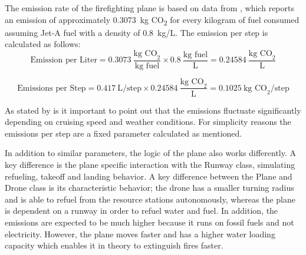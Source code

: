 \documentclass[11pt, a4paper]{article}
\begin{document}
The emission rate of the firefighting plane is based on data from \citet*{spicerRapidMeasurementEmissions2009}, which reports an emission of approximately \SI{0.3073}{\kilo\gram} CO\textsubscript{2} for every kilogram of fuel consumed assuming Jet-A fuel with a density of 0.8~kg/L. The emission per step is calculated as follows: 
\[
\text{Emission per Liter}  = 0.3073~\frac{\text{kg CO}_2}{\text{kg fuel}} \times 0.8~\frac{\text{kg fuel}}{\text{L}} = 0.24584~\frac{\text{kg CO}_2}{\text{L}}
\]

\[
\text{Emissions per Step} = 0.417~\text{L/step} \times 0.24584~\frac{\text{kg CO}_2}{\text{L}} = 0.1025~\text{kg CO}_2/\text{step}
\]


As stated by \citet*{spicerRapidMeasurementEmissions2009} is it important to point out that the emissions fluctuate significantly depending on cruising speed and weather conditions. For simplicity reasons the emissions per step are a fixed parameter calculated as mentioned.

In addition to similar parameters, the logic of the plane also works differently. A key difference is the plane specific interaction with the Runway class, simulating refueling, takeoff and landing behavior. A key difference between the Plane and Drone class is its characteristic behavior; the drone has a smaller turning radius and is able to refuel from the resource stations autonomously, whereas the plane is dependent on a runway in order to refuel water and fuel. In addition, the emissions are expected to be much higher because it runs on fossil fuels and not electricity. However, the plane moves faster and has a higher water loading capacity which enables it in theory to extinguish fires faster. 
\end{document}
